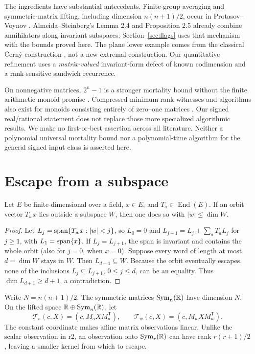 The ingredients have substantial antecedents. Finite-group averaging and symmetric-matrix lifting, including dimension \(n(n+1)/2\), occur in Protasov--Voynov \cite[Sections 7 and 9.1]{PV2017}. Almeida--Steinberg's Lemma 2.4 and Proposition 2.5 already combine annihilators along invariant subspaces; Section~\ref{sec:flags} uses that mechanism with the bounds proved here. The plane lower example comes from the classical \v Cern\'y construction \cite{Cerny1964}, not a new extremal construction. Our quantitative refinement uses a \emph{matrix-valued} invariant-form defect of known codimension and a rank-sensitive sandwich recurrence.

On nonnegative matrices, \(2^n-1\) is a stronger mortality bound without the finite arithmetic-monoid promise \cite{Ryzhikov2024}. Compressed minimum-rank witnesses and algorithms also exist for monoids consisting entirely of zero--one matrices \cite{KR2025}. Our signed real/rational statement does not replace those more specialized algorithmic results. We make no first-or-best assertion across all literature. Neither a polynomial universal mortality bound nor a polynomial-time algorithm for the general signed input class is asserted here.

\section{Escape from a subspace}
\begin{lemma}\label{lem:escape}
Let \(E\) be finite-dimensional over a field, \(x\in E\), and \(T_a\in\operatorname{End}(E)\). If an orbit vector \(T_wx\) lies outside a subspace \(W\), then one does so with \(|w|\leq\dim W\).
\end{lemma}
\begin{proof}
Let \(L_j=\operatorname{span}\{T_wx:|w|<j\}\), so \(L_0=0\) and
\(L_{j+1}=L_j+\sum_a T_aL_j\) for \(j\geq1\), with \(L_1=\operatorname{span}\{x\}\).
If \(L_j=L_{j+1}\), the span is invariant and contains the whole orbit (also for \(j=0\), when \(x=0\)). Suppose every word of length at most \(d=\dim W\) stays in \(W\). Then \(L_{d+1}\subseteq W\). Because the orbit eventually escapes, none of the inclusions \(L_j\subseteq L_{j+1}\), \(0\leq j\leq d\), can be an equality. Thus \(\dim L_{d+1}\geq d+1\), a contradiction.
\end{proof}

Write \(N=n(n+1)/2\). The symmetric matrices \(\operatorname{Sym}_n(\mathbb R)\) have dimension \(N\). On the lifted space \(\mathbb R\oplus\operatorname{Sym}_n(\mathbb R)\), let
\[
 \mathcal T_a(c,X)=(c,M_aXM_a^{\mathsf T}),\qquad
 \mathcal T_w(c,X)=(c,M_wXM_w^{\mathsf T}).
\]
The constant coordinate makes affine matrix observations linear. Unlike the scalar observation in r2, an observation onto \(\operatorname{Sym}_r(\mathbb R)\) can have rank \(r(r+1)/2\), leaving a smaller kernel from which to escape.

